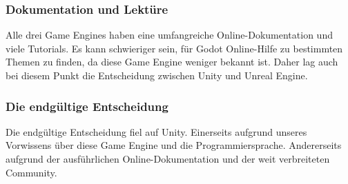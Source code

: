 \subsubsection{Dokumentation und Lektüre}
Alle drei Game Engines haben eine umfangreiche Online-Dokumentation und viele Tutorials. Es kann schwieriger sein, für Godot Online-Hilfe zu bestimmten Themen zu finden, da diese Game Engine weniger bekannt ist. Daher lag auch bei diesem Punkt die Entscheidung zwischen Unity und Unreal Engine.

\subsubsection{Die endgültige Entscheidung}
Die endgültige Entscheidung fiel auf Unity. Einerseits aufgrund unseres Vorwissens über diese Game Engine und die Programmiersprache. Andererseits aufgrund der ausführlichen Online-Dokumentation und der weit verbreiteten Community.
